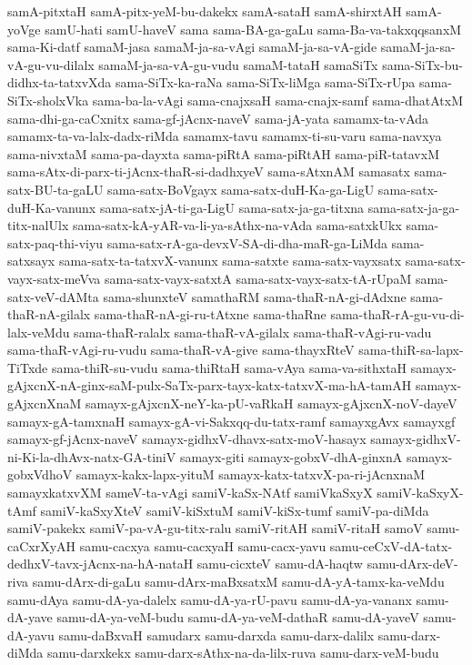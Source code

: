 {samA-pitxtaH
samA-pitx-yeM-bu-dakekx
samA-sataH
samA-shirxtAH
samA-yoVge
samU-hati
samU-haveV
sama
sama-BA-ga-gaLu
sama-Ba-va-takxqqsanxM
sama-Ki-datf
samaM-jasa
samaM-ja-sa-vAgi
samaM-ja-sa-vA-gide
samaM-ja-sa-vA-gu-vu-dilalx
samaM-ja-sa-vA-gu-vudu
samaM-tataH
samaSiTx
sama-SiTx-bu-didhx-ta-tatxvXda
sama-SiTx-ka-raNa
sama-SiTx-liMga
sama-SiTx-rUpa
sama-SiTx-sholxVka
sama-ba-la-vAgi
sama-cnajxsaH
sama-cnajx-samf
sama-dhatAtxM
sama-dhi-ga-caCxnitx
sama-gf-jAcnx-naveV
sama-jA-yata
samamx-ta-vAda
samamx-ta-va-lalx-dadx-riMda
samamx-tavu
samamx-ti-su-varu
sama-navxya
sama-nivxtaM
sama-pa-dayxta
sama-piRtA
sama-piRtAH
sama-piR-tatavxM
sama-sAtx-di-parx-ti-jAcnx-thaR-si-dadhxyeV
sama-sAtxnAM
samasatx
sama-satx-BU-ta-gaLU
sama-satx-BoVgayx
sama-satx-duH-Ka-ga-LigU
sama-satx-duH-Ka-vanunx
sama-satx-jA-ti-ga-LigU
sama-satx-ja-ga-titxna
sama-satx-ja-ga-titx-nalUlx
sama-satx-kA-yAR-va-li-ya-sAthx-na-vAda
sama-satxkUkx
sama-satx-paq-thi-viyu
sama-satx-rA-ga-devxV-SA-di-dha-maR-ga-LiMda
sama-satxsayx
sama-satx-ta-tatxvX-vanunx
sama-satxte
sama-satx-vayxsatx
sama-satx-vayx-satx-meVva
sama-satx-vayx-satxtA
sama-satx-vayx-satx-tA-rUpaM
sama-satx-veV-dAMta
sama-shunxteV
samathaRM
sama-thaR-nA-gi-dAdxne
sama-thaR-nA-gilalx
sama-thaR-nA-gi-ru-tAtxne
sama-thaRne
sama-thaR-rA-gu-vu-di-lalx-veMdu
sama-thaR-ralalx
sama-thaR-vA-gilalx
sama-thaR-vAgi-ru-vadu
sama-thaR-vAgi-ru-vudu
sama-thaR-vA-give
sama-thayxRteV
sama-thiR-sa-lapx-TiTxde
sama-thiR-su-vudu
sama-thiRtaH
sama-vAya
sama-va-sithxtaH
samayx-gAjxcnX-nA-ginx-saM-pulx-SaTx-parx-tayx-katx-tatxvX-ma-hA-tamAH
samayx-gAjxcnXnaM
samayx-gAjxcnX-neY-ka-pU-vaRkaH
samayx-gAjxcnX-noV-dayeV
samayx-gA-tamxnaH
samayx-gA-vi-Sakxqq-du-tatx-ramf
samayxgAvx
samayxgf
samayx-gf-jAcnx-naveV
samayx-gidhxV-dhavx-satx-moV-hasayx
samayx-gidhxV-ni-Ki-la-dhAvx-natx-GA-tiniV
samayx-giti
samayx-gobxV-dhA-ginxnA
samayx-gobxVdhoV
samayx-kakx-lapx-yituM
samayx-katx-tatxvX-pa-ri-jAcnxnaM
samayxkatxvXM
sameV-ta-vAgi
samiV-kaSx-NAtf
samiVkaSxyX
samiV-kaSxyX-tAmf
samiV-kaSxyXteV
samiV-kiSxtuM
samiV-kiSx-tumf
samiV-pa-diMda
samiV-pakekx
samiV-pa-vA-gu-titx-ralu
samiV-ritAH
samiV-ritaH
samoV
samu-caCxrXyAH
samu-cacxya
samu-cacxyaH
samu-cacx-yavu
samu-ceCxV-dA-tatx-dedhxV-tavx-jAcnx-na-hA-nataH
samu-cicxteV
samu-dA-haqtw
samu-dArx-deV-riva
samu-dArx-di-gaLu
samu-dArx-maBxsatxM
samu-dA-yA-tamx-ka-veMdu
samu-dAya
samu-dA-ya-dalelx
samu-dA-ya-rU-pavu
samu-dA-ya-vananx
samu-dA-yave
samu-dA-ya-veM-budu
samu-dA-ya-veM-dathaR
samu-dA-yaveV
samu-dA-yavu
samu-daBxvaH
samudarx
samu-darxda
samu-darx-dalilx
samu-darx-diMda
samu-darxkekx
samu-darx-sAthx-na-da-lilx-ruva
samu-darx-veM-budu
}

